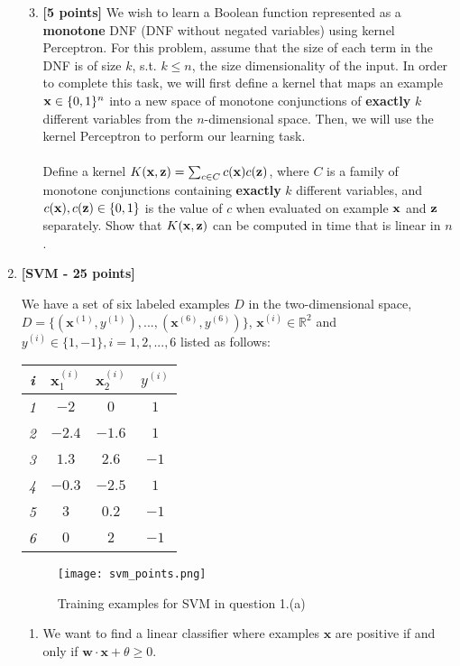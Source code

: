 \begin{enumerate}
\begin{enumerate}
 \setcounter{enumii}{2}
  \item \textbf{[5 points]} 
We wish to learn a Boolean function represented 
as a \textbf{monotone} DNF (DNF without negated variables) using kernel Perceptron. 
For this problem, assume that the size of each term in the DNF
is of size $k$, s.t. $k \leq n$, the size dimensionality of the input.
In order to complete this task, we will first define a kernel that 
maps an example ${\bf x} \in \{0, 1\}^n$ into a
new space of monotone conjunctions of \textbf{exactly} $k$ different variables from the
$n$-dimensional space. Then, we will use the kernel Perceptron to perform our
learning task. \\
\smallskip\\
\indent Define a kernel $K({\bf x}, {\bf z}) = \sum_{c \in C} c({\bf x}) c({\bf z})$,
    where $C$ is a family of monotone conjunctions containing \textbf{exactly} $k$ different
    variables, and $c({\bf x}),c({\bf z}) \in \{0, 1\}$ is the value of $c$ when evaluated
    on example ${\bf x}$ and ${\bf z}$ separately. Show that $K({\bf x},{\bf z})$ 
    can be computed in time that is linear in $n$. 
\end{enumerate}


\item {\bf [SVM - 25 points]}

\pp
We have a set of six labeled examples $D$ in the two-dimensional space, $D = \{(\mathbf{x}^{(1)}, y^{(1)}),...,(\mathbf{x}^{(6)}, y^{(6)})\}$, $\mathbf{x}^{(i)} \in \mathbb{R}^{2}$ and $y^{(i)} \in \{1, -1\}, i=1,2,...,6$ listed as follows:
  \begin{center}
    \begin{tabular}{|c|c|c|c|}
      \hline
      {\em i}  & $\mathbf{x}_1^{(i)}$  & $\mathbf{x}_2^{(i)}$ & $y^{(i)}$ \\
      \hline
      {\em 1}  & $-2$  & $0$ & $1$ \\
      \hline
      {\em 2}  & $-2.4$  & $-1.6$ & $1$ \\
      \hline
      {\em 3}  & $1.3$  & $2.6$ & $-1$ \\
      \hline
      {\em 4}  & $-0.3$  & $-2.5$ & $1$ \\
      \hline
      {\em 5}  & $3$  & $0.2$ & $-1$ \\
      \hline
      {\em 6}  & $0$  & $2$ & $-1$ \\
      \hline
    \end{tabular}
  \end{center}
  \begin{figure}[h!]
        \begin{center}
         \hspace{5cm}
          \texttt{[image: svm\_points.png]}
          \caption{Training examples for SVM in question 1.(a)}
          \label{fig:1-500}
        \end{center}
      \end{figure}
\begin{enumerate}
\item[(a)][$4$ points]
We want to find a linear classifier where examples $\mathbf{x}$ are positive if and only if $\mathbf{w}\cdot \mathbf{x} + \theta \geq 0$.


\end{enumerate}
\end{enumerate}
